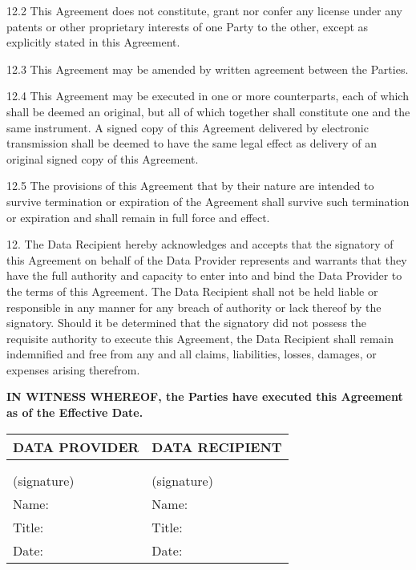 {\begin{enumerate}
12.2 This Agreement does not constitute, grant nor confer any license under any patents or other proprietary interests of one Party to the other, except as explicitly stated in this Agreement.

12.3 This Agreement may be amended by written agreement between the Parties.

12.4 This Agreement may be executed in one or more counterparts, each of which shall be deemed an original, but all of which together shall constitute one and the same instrument. A signed copy of this Agreement delivered by electronic transmission shall be deemed to have the same legal effect as delivery of an original signed copy of this Agreement.

12.5 The provisions of this Agreement that by their nature are intended to survive termination or expiration of the Agreement shall survive such termination or expiration and shall remain in full force and effect.


12. The Data Recipient hereby acknowledges and accepts that the signatory of this Agreement on behalf of the Data Provider represents and warrants that they have the full authority and capacity to enter into and bind the Data Provider to the terms of this Agreement. The Data Recipient shall not be held liable or responsible in any manner for any breach of authority or lack thereof by the signatory. Should it be determined that the signatory did not possess the requisite authority to execute this Agreement, the Data Recipient shall remain indemnified and free from any and all claims, liabilities, losses, damages, or expenses arising therefrom.

\vspace{0.5cm}

\textbf{IN WITNESS WHEREOF, the Parties have executed this Agreement as of the  Effective Date.}

\vspace{1cm}

\begin{tabular}{|p{}|p{}|}
\hline
\textbf{DATA PROVIDER} & \textbf{DATA RECIPIENT} \\
\hline
 & \\
 & \\
\hline
(signature) & (signature) \\
\hline
Name: & Name: \\
\hline
Title: & Title: \\
\hline
Date: & Date: \\
\hline
\end{tabular}


\end{enumerate}}
